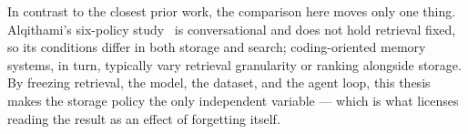 In contrast to the closest prior work, the comparison here moves only one thing.
Alqithami's six-policy study~\cite{alqithami2025} is conversational and does not hold
retrieval fixed, so its conditions differ in both storage and search; coding-oriented
memory systems, in turn, typically vary retrieval granularity or ranking alongside
storage. By freezing retrieval, the model, the dataset, and the agent loop, this thesis
makes the storage policy the only independent variable --- which is what licenses reading
the result as an effect of forgetting itself.
